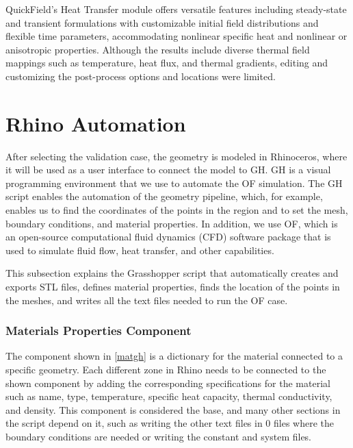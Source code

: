 QuickField's Heat Transfer module offers versatile features including steady-state and transient formulations with customizable initial field distributions and flexible time parameters, accommodating nonlinear specific heat and nonlinear or anisotropic properties. Although the results include diverse thermal field mappings such as temperature, heat flux, and thermal gradients, editing and customizing the post-process options and locations were limited.




\section{Rhino  Automation} %
After selecting the validation case, the geometry is modeled in Rhinoceros, where it will be used as a user interface to connect the model to \gls{GH}. \gls{GH} is a visual programming environment that we use to automate the \gls{OF} simulation. 
The \gls{GH} script enables the automation of the geometry pipeline, which, for example, enables us to find the coordinates of the points in the region and to set the mesh, boundary conditions, and material properties. 
In addition, we use \gls{OF}, which is an open-source computational fluid dynamics (CFD) software package that is used to simulate fluid flow, heat transfer, and other capabilities. 


This subsection explains the Grasshopper script that automatically creates and exports STL files, defines material properties, finds the location of the points in the meshes, and writes all the text files needed to run the \gls{OF} case.

\subsubsection{Materials Properties Component}
The component shown in \ref{matgh} is a dictionary for the material connected to a specific geometry. Each different zone in Rhino needs to be connected to the shown component by adding the corresponding specifications for the material such as name, type, temperature, specific heat capacity, thermal conductivity, and density. This component is considered the base, and many other sections in the script depend on it, such as writing the other text files in 0 files where the boundary conditions are needed or writing the constant and system files. 


